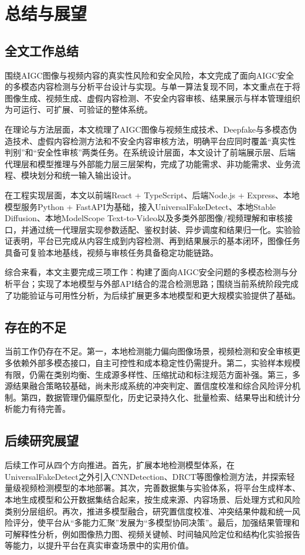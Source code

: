
\chapter{总结与展望}

\section{全文工作总结}

围绕AIGC图像与视频内容的真实性风险和安全风险，本文完成了面向AIGC安全的多模态内容检测与分析平台设计与实现。与单一算法复现不同，本文重点在于将图像生成、视频生成、虚假内容检测、不安全内容审核、结果展示与样本管理组织为可运行、可扩展、可验证的整体系统。

在理论与方法层面，本文梳理了AIGC图像与视频生成技术、Deepfake与多模态伪造技术、虚假内容检测方法和不安全内容审核方法，明确平台应同时覆盖“真实性判别”和“安全性审核”两类任务。在系统设计层面，本文设计了前端展示层、后端代理层和模型推理与外部能力层三层架构，完成了功能需求、非功能需求、业务流程、模块划分和统一输入输出设计。

在工程实现层面，本文以前端React + TypeScript、后端Node.js + Express、本地模型服务Python + FastAPI为基础，接入UniversalFakeDetect、本地Stable Diffusion、本地ModelScope Text-to-Video以及多类外部图像/视频理解和审核接口，并通过统一代理层实现参数适配、鉴权封装、异步调度和结果归一化。实验验证表明，平台已完成从内容生成到内容检测、再到结果展示的基本闭环，图像任务具备可复验本地基线，视频与审核任务具备稳定功能链路。

综合来看，本文主要完成三项工作：构建了面向AIGC安全问题的多模态检测与分析平台；实现了本地模型与外部API结合的混合检测思路；围绕当前系统阶段完成了功能验证与可用性分析，为后续扩展更多本地模型和更大规模实验提供了基础。

\section{存在的不足}

当前工作仍存在不足。第一，本地检测能力偏向图像场景，视频检测和安全审核更多依赖外部多模态接口，自主可控性和成本稳定性仍需提升。第二，实验样本规模有限，仍需在类别均衡、生成源多样性、压缩扰动和标注规范方面补强。第三，多源结果融合策略较基础，尚未形成系统的冲突判定、置信度校准和综合风险评分机制。第四，数据管理仍偏原型化，历史记录持久化、批量检索、结果导出和统计分析能力有待完善。

\section{后续研究展望}

后续工作可从四个方向推进。首先，扩展本地检测模型体系，在UniversalFakeDetect之外引入CNNDetection、DRCT等图像检测方法，并探索轻量级视频检测模型的本地部署。其次，完善数据集与实验体系，将平台生成样本、本地生成模型和公开数据集结合起来，按生成来源、内容场景、后处理方式和风险类别分层组织。再次，推进多模型融合，研究置信度校准、冲突结果仲裁和统一风险评分，使平台从“多能力汇聚”发展为“多模型协同决策”。最后，加强结果管理和可解释性分析，例如图像热力图、视频关键帧、时间轴风险定位和结构化实验报告等能力，以提升平台在真实审查场景中的实用价值。

